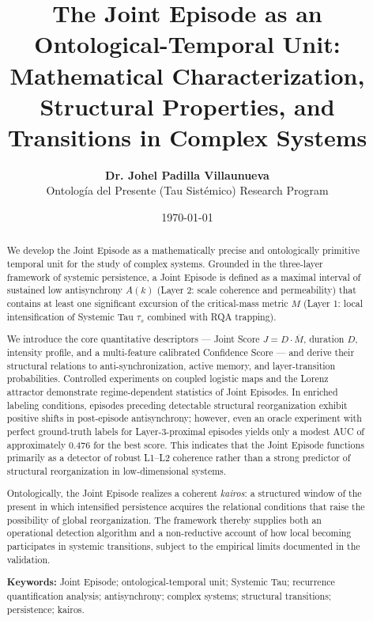 \documentclass[11pt,a4paper]{article}
\title{\textbf{The Joint Episode as an Ontological-Temporal Unit:}\\[0.25em]
\large Mathematical Characterization, Structural Properties, and Transitions in Complex Systems}
\author{
    \textbf{Dr. Johel Padilla Villaunueva}\\[0.2em]
    \small Ontología del Presente (Tau Sistémico) Research Program
}
\date{\today}
\begin{document}
\maketitle

\begin{abstract}
\noindent
We develop the Joint Episode as a mathematically precise and ontologically primitive temporal unit for the study of complex systems. Grounded in the three-layer framework of systemic persistence, a Joint Episode is defined as a maximal interval of sustained low antisynchrony $A(k)$ (Layer 2: scale coherence and permeability) that contains at least one significant excursion of the critical-mass metric $M$ (Layer 1: local intensification of Systemic Tau $\tau_s$ combined with RQA trapping). 

We introduce the core quantitative descriptors — Joint Score $J = D \cdot \overline{M}$, duration $D$, intensity profile, and a multi-feature calibrated Confidence Score — and derive their structural relations to anti-synchronization, active memory, and layer-transition probabilities. Controlled experiments on coupled logistic maps and the Lorenz attractor demonstrate regime-dependent statistics of Joint Episodes. In enriched labeling conditions, episodes preceding detectable structural reorganization exhibit positive shifts in post-episode antisynchrony; however, even an oracle experiment with perfect ground-truth labels for Layer-3-proximal episodes yields only a modest AUC of approximately 0.476 for the best score. This indicates that the Joint Episode functions primarily as a detector of robust L1--L2 coherence rather than a strong predictor of structural reorganization in low-dimensional systems.

Ontologically, the Joint Episode realizes a coherent \textit{kairos}: a structured window of the present in which intensified persistence acquires the relational conditions that raise the possibility of global reorganization. The framework thereby supplies both an operational detection algorithm and a non-reductive account of how local becoming participates in systemic transitions, subject to the empirical limits documented in the validation.

\vspace{0.1em}
\noindent\textbf{Keywords:} Joint Episode; ontological-temporal unit; Systemic Tau; recurrence quantification analysis; antisynchrony; complex systems; structural transitions; persistence; kairos.
\end{abstract}
\end{document}
